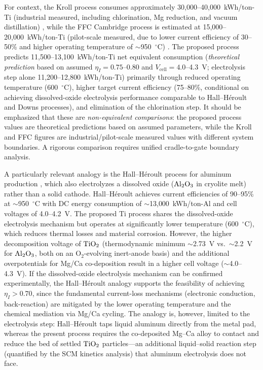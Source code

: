 \documentclass[11pt]{article}
\begin{document}
For context, the Kroll process consumes approximately 30{,}000--40{,}000~kWh/ton-Ti (industrial measured, including chlorination, Mg reduction, and vacuum distillation) \cite{ji2026}, while the FFC Cambridge process is estimated at 15{,}000--20{,}000~kWh/ton-Ti (pilot-scale measured, due to lower current efficiency of 30--50\% and higher operating temperature of $\sim$950~$^{\circ}$C) \cite{ji2026,fray2000}. The proposed process predicts 11{,}500--13{,}100~kWh/ton-Ti net equivalent consumption (\emph{theoretical prediction} based on assumed $\eta_I = 0.75$--0.80 and $V_{\mathrm{cell}} = 4.0$--4.3~V; electrolysis step alone 11{,}200--12{,}800~kWh/ton-Ti) primarily through reduced operating temperature (600~$^{\circ}$C), higher target current efficiency (75--80\%, conditional on achieving dissolved-oxide electrolysis performance comparable to Hall--H\'eroult and Downs processes), and elimination of the chlorination step. It should be emphasized that these are \emph{non-equivalent comparisons}: the proposed process values are theoretical predictions based on assumed parameters, while the Kroll and FFC figures are industrial/pilot-scale measured values with different system boundaries. A rigorous comparison requires unified cradle-to-gate boundary analysis.

A particularly relevant analogy is the Hall--H\'eroult process for aluminum production \cite{kvande2014}, which also electrolyzes a dissolved oxide ($\ce{Al2O3}$ in cryolite melt) rather than a solid cathode. Hall--H\'eroult achieves current efficiencies of 90--95\% at $\sim$950~$^{\circ}$C with DC energy consumption of $\sim$13{,}000~kWh/ton-Al and cell voltages of 4.0--4.2~V. The proposed Ti process shares the dissolved-oxide electrolysis mechanism but operates at significantly lower temperature (600~$^{\circ}$C), which reduces thermal losses and material corrosion. However, the higher decomposition voltage of $\ce{TiO2}$ (thermodynamic minimum $\sim$2.73~V vs.\ $\sim$2.2~V for $\ce{Al2O3}$, both on an O$_2$-evolving inert-anode basis) and the additional overpotentials for Mg/Ca co-deposition result in a higher cell voltage ($\sim$4.0--4.3~V). If the dissolved-oxide electrolysis mechanism can be confirmed experimentally, the Hall--H\'eroult analogy supports the feasibility of achieving $\eta_I > 0.70$, since the fundamental current-loss mechanisms (electronic conduction, back-reaction) are mitigated by the lower operating temperature and the chemical mediation via Mg/Ca cycling. The analogy is, however, limited to the electrolysis step: Hall--H\'eroult taps liquid aluminum directly from the metal pad, whereas the present process requires the co-deposited Mg--Ca alloy to contact and reduce the bed of settled $\ce{TiO2}$ particles---an additional liquid--solid reaction step (quantified by the SCM kinetics analysis) that aluminum electrolysis does not face.
\end{document}
